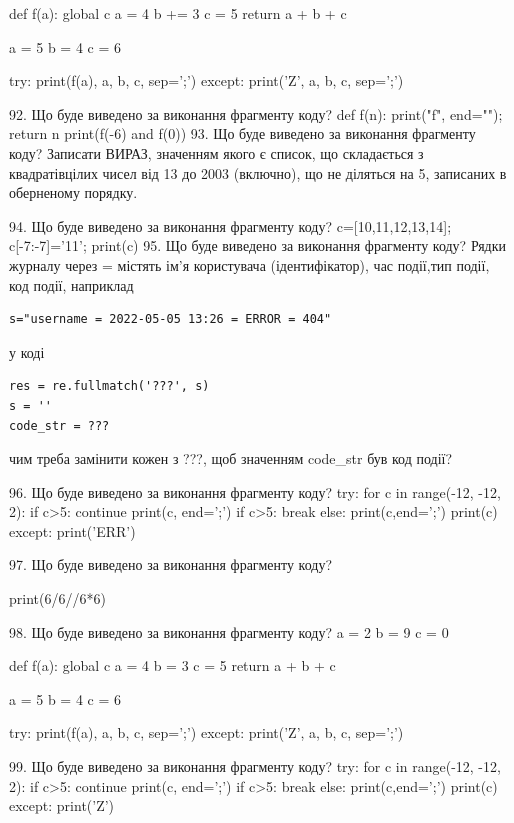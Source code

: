 \documentclass[11pt]{article}
\begin{document}
def f(a):
global c    a = 4
    b += 3
    c = 5
    return a + b + c

a = 5
b = 4
c = 6

try:
    print(f(a), a, b, c, sep=';')
except:
    print('Z', a, b, c, sep=';')

92. Що буде виведено за виконання фрагменту коду?
def f(n): print("f", end=""); return n
   print(f(-6) and f(0))
93. Що буде виведено за виконання фрагменту коду?
Записати ВИРАЗ, значенням якого є список, що складається з квадратівцілих чисел від 13 до 2003 (включно), що не діляться на 5, записаних в обернено\-му порядку.

94. Що буде виведено за виконання фрагменту коду?
c=[10,11,12,13,14]; c[-7:-7]='11'; print(c)
95. Що буде виведено за виконання фрагменту коду?
Рядки журналу через = містять ім'я користувача (ідентифікатор), час події,тип події, код події, наприклад
\begin{verbatim}
s="username = 2022-05-05 13:26 = ERROR = 404"
\end{verbatim}
у коді 
\begin{verbatim}
res = re.fullmatch('???', s) 
s = ''
code_str = ??? 
\end{verbatim}
чим треба замінити кожен з ???, щоб значенням code\_str був код події? 



96. Що буде виведено за виконання фрагменту коду?
try:
    for c in range(-12, -12, 2):
        if c>5:
            continue
        print(c, end=';')
        if c>5:
            break
    else:
        print(c,end=';')
    print(c)
except:
    print('ERR')

97. Що буде виведено за виконання фрагменту коду?

print(6/6//6*6)

98. Що буде виведено за виконання фрагменту коду?
a = 2
b = 9
c = 0

def f(a):
global c    a = 4
    b = 3
    c = 5
    return a + b + c

a = 5
b = 4
c = 6

try:
    print(f(a), a, b, c, sep=';')
except:
    print('Z', a, b, c, sep=';')

99. Що буде виведено за виконання фрагменту коду?
try:
    for c in range(-12, -12, 2):
        if c>5:
            continue
        print(c, end=';')
        if c>5:
            break
    else:
        print(c,end=';')
    print(c)
except:
    print('Z')
\end{document}
